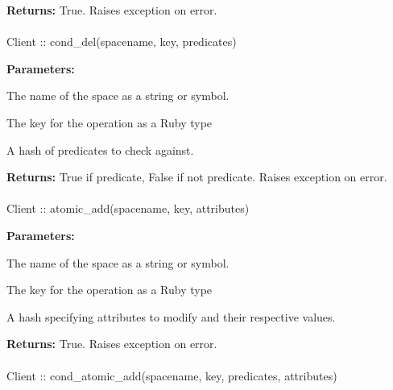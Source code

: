 \noindent\textbf{Returns:}
True.  Raises exception on error.

\paragraph{}
\label{api:ruby:cond_del}
\begin{ccode}
Client :: cond_del(spacename, key, predicates)
\end{ccode}
\funcdesc 

\noindent\textbf{Parameters:}
\begin{description}[labelindent=\widthof{{\code{predicates}}},leftmargin=*,noitemsep,nolistsep,align=right]
\item[\code{spacename}] The name of the space as a string or symbol.
\item[\code{key}] The key for the operation as a Ruby type
\item[\code{predicates}] A hash of predicates to check against.
\end{description}

\noindent\textbf{Returns:}
True if predicate, False if not predicate.  Raises exception on error.

\paragraph{}
\label{api:ruby:atomic_add}
\begin{ccode}
Client :: atomic_add(spacename, key, attributes)
\end{ccode}
\funcdesc 

\noindent\textbf{Parameters:}
\begin{description}[labelindent=\widthof{{\code{attributes}}},leftmargin=*,noitemsep,nolistsep,align=right]
\item[\code{spacename}] The name of the space as a string or symbol.
\item[\code{key}] The key for the operation as a Ruby type
\item[\code{attributes}] A hash specifying attributes to modify and their respective values.
\end{description}

\noindent\textbf{Returns:}
True.  Raises exception on error.

\paragraph{}
\label{api:ruby:cond_atomic_add}
\begin{ccode}
Client :: cond_atomic_add(spacename, key, predicates, attributes)
\end{ccode}
\funcdesc 

